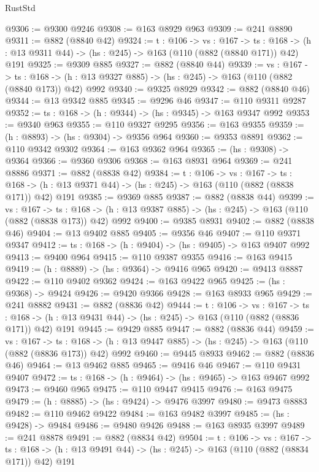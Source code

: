 \begin{lexlean}{RustStd}
\begin{coremodule}
@9306 := @9300 @9246
@9308 := @163 @8929 @963
@9309 := @241 @8890
@9311 := @882 (@8840 @42)
@9324 := {t : @106} ->
  {vs : @167} ->
  {ts : @168} -> (h : @13 @9311 @44) -> (hs : @245) -> @163 (@110 (@882 (@8840 @171)) @42) @191
@9325 := @9309 @885
@9327 := @882 (@8840 @44)
@9339 := {vs : @167} ->
  {ts : @168} -> (h : @13 @9327 @885) -> (hs : @245) -> @163 (@110 (@882 (@8840 @173)) @42) @992
@9340 := @9325 @8929
@9342 := @882 (@8840 @46)
@9344 := @13 @9342 @885
@9345 := @9296 @46
@9347 := @110 @9311 @9287
@9352 := {ts : @168} -> (h : @9344) -> (hs : @9345) -> @163 @9347 @992
@9353 := @9340 @963
@9355 := @110 @9327 @9295
@9356 := @163 @9355
@9359 := (h : @8893) -> (hs : @9304) -> @9356 @964
@9360 := @9353 @8891
@9362 := @110 @9342 @9302
@9364 := @163 @9362 @964
@9365 := (hs : @9308) -> @9364
@9366 := @9360 @9306
@9368 := @163 @8931 @964
@9369 := @241 @8886
@9371 := @882 (@8838 @42)
@9384 := {t : @106} ->
  {vs : @167} ->
  {ts : @168} -> (h : @13 @9371 @44) -> (hs : @245) -> @163 (@110 (@882 (@8838 @171)) @42) @191
@9385 := @9369 @885
@9387 := @882 (@8838 @44)
@9399 := {vs : @167} ->
  {ts : @168} -> (h : @13 @9387 @885) -> (hs : @245) -> @163 (@110 (@882 (@8838 @173)) @42) @992
@9400 := @9385 @8931
@9402 := @882 (@8838 @46)
@9404 := @13 @9402 @885
@9405 := @9356 @46
@9407 := @110 @9371 @9347
@9412 := {ts : @168} -> (h : @9404) -> (hs : @9405) -> @163 @9407 @992
@9413 := @9400 @964
@9415 := @110 @9387 @9355
@9416 := @163 @9415
@9419 := (h : @8889) -> (hs : @9364) -> @9416 @965
@9420 := @9413 @8887
@9422 := @110 @9402 @9362
@9424 := @163 @9422 @965
@9425 := (hs : @9368) -> @9424
@9426 := @9420 @9366
@9428 := @163 @8933 @965
@9429 := @241 @8882
@9431 := @882 (@8836 @42)
@9444 := {t : @106} ->
  {vs : @167} ->
  {ts : @168} -> (h : @13 @9431 @44) -> (hs : @245) -> @163 (@110 (@882 (@8836 @171)) @42) @191
@9445 := @9429 @885
@9447 := @882 (@8836 @44)
@9459 := {vs : @167} ->
  {ts : @168} -> (h : @13 @9447 @885) -> (hs : @245) -> @163 (@110 (@882 (@8836 @173)) @42) @992
@9460 := @9445 @8933
@9462 := @882 (@8836 @46)
@9464 := @13 @9462 @885
@9465 := @9416 @46
@9467 := @110 @9431 @9407
@9472 := {ts : @168} -> (h : @9464) -> (hs : @9465) -> @163 @9467 @992
@9473 := @9460 @965
@9475 := @110 @9447 @9415
@9476 := @163 @9475
@9479 := (h : @8885) -> (hs : @9424) -> @9476 @3997
@9480 := @9473 @8883
@9482 := @110 @9462 @9422
@9484 := @163 @9482 @3997
@9485 := (hs : @9428) -> @9484
@9486 := @9480 @9426
@9488 := @163 @8935 @3997
@9489 := @241 @8878
@9491 := @882 (@8834 @42)
@9504 := {t : @106} ->
  {vs : @167} ->
  {ts : @168} -> (h : @13 @9491 @44) -> (hs : @245) -> @163 (@110 (@882 (@8834 @171)) @42) @191

\end{coremodule}
\end{lexlean}
